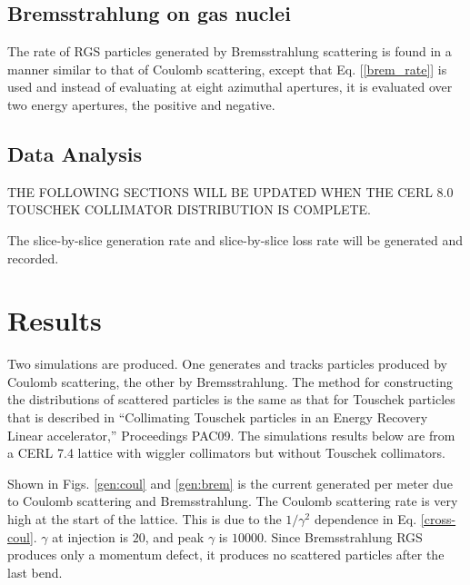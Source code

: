 \documentclass[a4paper,10pt]{article}
\begin{document}
\subsection{Bremsstrahlung on gas nuclei}

The rate of RGS particles generated by Bremsstrahlung scattering is found in a manner similar to that of Coulomb scattering, except that
Eq. [\ref{brem_rate}] is used and instead of evaluating at eight azimuthal apertures, it is evaluated over two energy apertures, the positive 
and negative.

\subsection{Data Analysis}

THE FOLLOWING SECTIONS WILL BE UPDATED WHEN THE CERL 8.0 TOUSCHEK COLLIMATOR DISTRIBUTION IS COMPLETE.

The slice-by-slice generation rate and slice-by-slice loss rate will be generated and recorded.

\section{Results}

Two simulations are produced.  One generates and tracks particles produced by Coulomb scattering, the other by Bremsstrahlung.  The method for constructing the distributions of scattered particles is the same as that for Touschek particles that is described in ``Collimating Touschek particles in an Energy Recovery Linear accelerator,'' Proceedings PAC09.  The simulations results below are from a CERL 7.4 lattice with wiggler collimators but without Touschek collimators.

Shown in Figs. \ref{gen:coul} and \ref{gen:brem} is the current generated per meter due to Coulomb scattering and Bremsstrahlung.  The Coulomb scattering rate is very high at the start of the lattice.  This is due to the $1/\gamma^2$ dependence in Eq. \ref{cross-coul}. $\gamma$ at injection is $20$, and peak $\gamma$ is $10000$.  Since Bremsstrahlung RGS produces only a momentum defect, it produces no scattered particles after the last bend.
\end{document}
